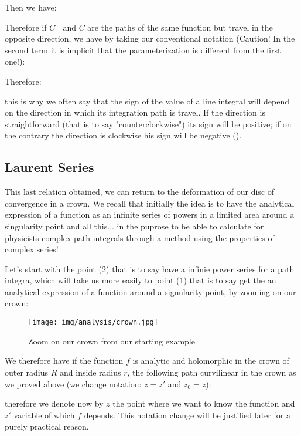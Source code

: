 	Then we have:
	
	Therefore if $C^-$ and $C$ are the paths of the same function but travel in the opposite direction, we have by taking our conventional notation (Caution! In the second term it is implicit that the parameterization is different from the first one!):
	
	Therefore:
	
	this is why we often say that the sign of the value of a line integral will depend on the direction in which its integration path is travel. If the direction is straightforward (that is to say "counterclockwise") its sign will be positive; if on the contrary the direction is clockwise his sign will be negative ().
	
	\pagebreak
	\subsection{Laurent Series}
	This last relation obtained, we can return to the deformation of our disc of convergence in a crown. We recall that initially the idea is to have the analytical expression of a function as an infinite series of powers in a limited area around a singularity point and all this... in the puprose to be able to calculate for physicists complex path integrals through a method using the properties of complex series!
	
	Let's start with the point (2) that is to say have a infinie power series for a path integra, which will take us more easily to point (1) that is to say get the an analytical expression of a function around a signularity point, by zooming on our crown:
	
	\begin{figure}[H]
		\begin{center}
			\texttt{[image: img/analysis/crown.jpg]}
		\end{center}	
		\caption{Zoom on our crown from our starting example}
	\end{figure}
	We therefore have if the function $f$ is analytic and holomorphic in the crown of outer radius $R$ and inside radius $r$, the following path curvilinear in the crown as we proved above (we change notation: $z=z'$ and $z_0=z$):
	
	
	therefore we denote now by $z$ the point where we want to know the function and $z'$ variable of which $f$ depends. This notation change will be justified later for a purely practical reason.
	
